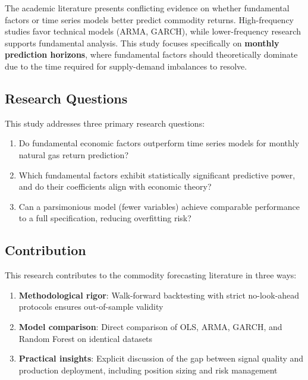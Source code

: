 \documentclass[12pt,a4paper]{article}
\begin{document}
The academic literature presents conflicting evidence on whether fundamental factors or time series models better predict commodity returns. High-frequency studies favor technical models (ARMA, GARCH), while lower-frequency research supports fundamental analysis. This study focuses specifically on \textbf{monthly prediction horizons}, where fundamental factors should theoretically dominate due to the time required for supply-demand imbalances to resolve.

\subsection{Research Questions}

This study addresses three primary research questions:

\begin{enumerate}
    \item Do fundamental economic factors outperform time series models for monthly natural gas return prediction?

    \item Which fundamental factors exhibit statistically significant predictive power, and do their coefficients align with economic theory?

    \item Can a parsimonious model (fewer variables) achieve comparable performance to a full specification, reducing overfitting risk?
\end{enumerate}

\subsection{Contribution}

This research contributes to the commodity forecasting literature in three ways:

\begin{enumerate}
    \item \textbf{Methodological rigor}: Walk-forward backtesting with strict no-look-ahead protocols ensures out-of-sample validity

    \item \textbf{Model comparison}: Direct comparison of OLS, ARMA, GARCH, and Random Forest on identical datasets

    \item \textbf{Practical insights}: Explicit discussion of the gap between signal quality and production deployment, including position sizing and risk management
\end{enumerate}
\end{document}
